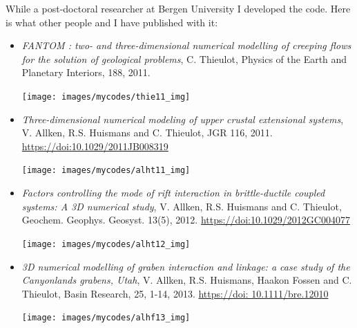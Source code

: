 While a post-doctoral researcher at Bergen University I developed the \fantom code. 
Here is what other people and I have published with it:

\begin{itemize}

\item {\it FANTOM : two- and three-dimensional numerical modelling of creeping flows for the solution of geological problems}, 
C. Thieulot, Physics of the Earth and Planetary Interiors, 188, 2011.

\begin{center}
\texttt{[image: images/mycodes/thie11\_img]}
\end{center}


\item {\it Three-dimensional numerical modeling of upper crustal extensional systems}, 
V. Allken, R.S. Huismans and C. Thieulot, JGR 116, 2011. \url{https://doi:10.1029/2011JB008319} 

\begin{center}
\texttt{[image: images/mycodes/alht11\_img]}
\end{center}


\item {\it Factors controlling the mode of rift interaction in brittle-ductile coupled systems: A 3D numerical study}, 
V. Allken, R.S. Huismans and C. Thieulot, Geochem. Geophys. Geosyst. 13(5), 2012.
\url{https://doi:10.1029/2012GC004077}

\begin{center}
\texttt{[image: images/mycodes/alht12\_img]}
\end{center}


\item {\it 3D numerical modelling of graben interaction and linkage: a case study of the Canyonlands grabens, Utah}, 
V. Allken, R.S. Huismans, Haakon Fossen and C. Thieulot, Basin Research, 25, 1-14, 2013.
\url{https://doi: 10.1111/bre.12010}

\begin{center}
\texttt{[image: images/mycodes/alhf13\_img]}
\end{center}



\end{itemize}
